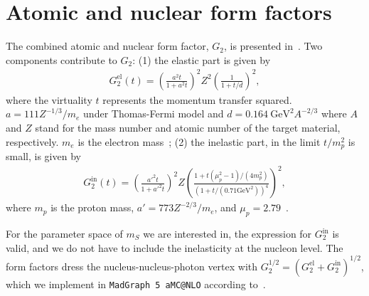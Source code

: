 \documentclass[prd,onecolumn,notitlepage,
nofootinbib,aps,tightenlines,
preprintnumbers,amsmath,amssymb,amsfonts,showpacs,superscriptaddress]{revtex4-1}
\newcommand{\f}{\frac}
\newcommand{\be}{\begin{eqnarray}}
\newcommand{\ee}{\end{eqnarray}}
\begin{document}
\appendix

\appendix

\section{Atomic and nuclear form factors}
\label{appendix}

The combined atomic and nuclear form factor, $G_2$, is presented in~\cite{Kim:1973he,Tsai:1973py,Tsai:1986tx, Bjorken:2009mm}. Two components contribute to $G_2$: (1) the elastic part is given by
\be
G_{2}^{\text{el}}(t) = \left(\f{a^2 t}{1+a^2 t}\right)^2 Z^2 \left(\f{1}{1+{t/d}}\right)^2 ,
\ee
where the virtuality $t$ represents the momentum transfer squared. $a=111 Z^{-1/3}/m_e$ under Thomas-Fermi model and $d=0.164~\text{GeV}^2A^{-2/3}$ where $A$ and $Z$ stand for the mass number and atomic number of the target material, respectively. $m_e$ is the electron mass~\cite{Kim:1973he,Tsai:1973py,Tsai:1986tx}; (2) the inelastic part,  in the limit $t/m_p^2$ is small, is given by 
\be
G_{2}^{\text{in}}(t)=\left(\f{a'^2 t}{1+a'^2 t}\right)^2 Z \left(\f{1+t(\mu_p^2-1)/(4m_p^2)}{\left(1+t/(0.71 \text{GeV}^2)\right)^4}\right)^2 ,
\ee
where $m_p$ is the proton mass, $a'=773 Z^{-2/3}/m_e$, and $\mu_p=2.79$~\cite{Kim:1973he}. 

For the parameter space of $m_{S}$ we are interested in, the expression for $G_{2}^{\text{in}}$ is valid, 
and we do not have to include the inelasticity at the nucleon level. 
The form factors dress the nucleus-nucleus-photon vertex with $G_2^{1/2}=(G_{2}^{\text{el}}+G_{2}^{\text{in}})^{1/2}$, which we implement in \texttt{MadGraph 5 aMC@NLO} according to~\cite{MG5FF}.


\newpage
%


\end{document}
